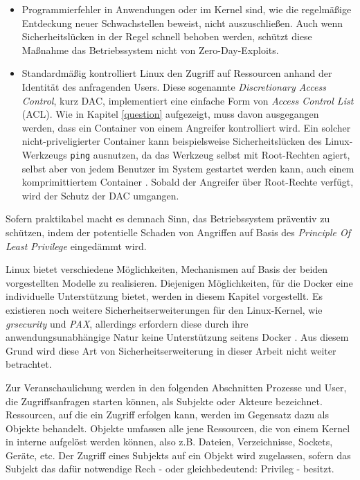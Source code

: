 \documentclass[../main.tex]{subfiles}
\begin{document}
{		\begin{itemize}
			\item	Programmierfehler in Anwendungen oder im Kernel sind, wie die regelmäßige Entdeckung neuer Schwachstellen beweist, nicht auszuschließen. Auch wenn Sicherheitslücken in der Regel schnell behoben werden, schützt diese Maßnahme das Betriebssystem nicht von Zero-Day-Exploits.
			\item	Standardmäßig kontrolliert Linux den Zugriff auf Ressourcen anhand der Identität des anfragenden Users. Diese sogenannte \emph{Discretionary Access Control}, kurz \acrshort{DAC}, implementiert eine einfache Form von \emph{Access Control List} (\acrshort{ACL}). Wie in Kapitel \ref{question} aufgezeigt, muss davon ausgegangen werden, dass ein Container von einem Angreifer kontrolliert wird. Ein solcher nicht-priveligierter Container kann beispielsweise Sicherheitslücken des Linux-Werkzeugs \texttt{ping} ausnutzen, da das Werkzeug selbst mit Root-Rechten agiert, selbst aber von jedem Benutzer im System gestartet werden kann, auch einem komprimittiertem Container \cite[S.26]{SELinuxApparmor}. Sobald der Angreifer über Root-Rechte verfügt, wird der Schutz der \acrshort{DAC} umgangen.
		\end{itemize}

		Sofern praktikabel macht es demnach Sinn, das Betriebssystem präventiv zu schützen, indem der potentielle Schaden von Angriffen auf Basis des \emph{Principle Of Least Privilege} eingedämmt wird.

		Linux bietet verschiedene Möglichkeiten, Mechanismen auf Basis der beiden vorgestellten Modelle zu realisieren. Diejenigen Möglichkeiten, für die Docker eine individuelle Unterstützung bietet, werden in diesem Kapitel vorgestellt. Es existieren noch weitere Sicherheitserweiterungen für den Linux-Kernel, wie \emph{grsecurity} und \emph{PAX}, allerdings erfordern diese durch ihre anwendungsunabhängige Natur keine Unterstützung seitens Docker \cite{dockerSecurity}. Aus diesem Grund wird diese Art von Sicherheitserweiterung in dieser Arbeit nicht weiter betrachtet.

		Zur Veranschaulichung werden in den folgenden Abschnitten Prozesse und User, die Zugriffsanfragen starten können, als Subjekte oder Akteure bezeichnet. Ressourcen, auf die ein Zugriff erfolgen kann, werden im Gegensatz dazu als Objekte behandelt. Objekte umfassen alle jene Ressourcen, die von einem Kernel in interne  aufgelöst werden können, also z.B. Dateien, Verzeichnisse, Sockets, Geräte, etc. Der Zugriff eines Subjekts auf ein Objekt wird zugelassen, sofern das Subjekt das dafür notwendige Rech - oder gleichbedeutend: Privileg - besitzt.

}
\end{document}
